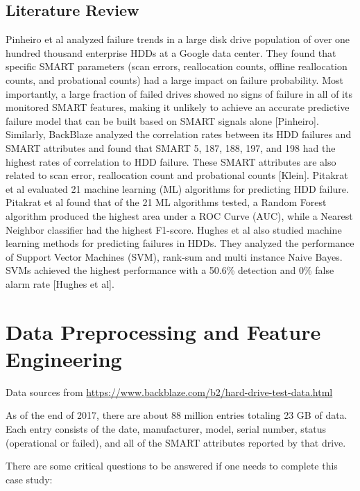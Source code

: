 \documentclass[12pt,a4paper,english]{amsart}
\begin{document}
\subsection{Literature Review}

Pinheiro et al analyzed failure trends in a large disk drive population of over one hundred thousand enterprise HDDs at a Google data center. They found that specific SMART parameters (scan errors, reallocation counts, offline reallocation counts, and probational counts) had a large impact on failure probability. Most importantly, a large fraction of failed drives showed no signs of failure in all of its monitored SMART features, making it unlikely to achieve an accurate predictive failure model that can be built based on SMART signals alone [Pinheiro]. Similarly, BackBlaze analyzed the correlation rates between its HDD failures and SMART attributes and found that SMART 5, 187, 188, 197, and 198 had the highest rates of correlation to HDD failure. These SMART attributes are also related   to   scan   error,   reallocation   count   and   probational   counts   [Klein].
Pitakrat et al evaluated 21 machine learning (ML) algorithms for predicting HDD failure. Pitakrat et al found that of the 21 ML algorithms tested, a Random Forest algorithm produced the highest area under a ROC Curve (AUC), while   a   Nearest   Neighbor   classifier   had   the   highest   F1-score.
Hughes et al also studied machine learning methods for predicting failures in HDDs. They analyzed the performance of Support Vector Machines (SVM), rank-sum and multi instance Naive Bayes. SVMs achieved the highest   performance   with   a   50.6\%   detection   and   0\%   false   alarm   rate   [Hughes   et   al].

%
\section{Data Preprocessing and Feature Engineering}

Data sources from \url{https://www.backblaze.com/b2/hard-drive-test-data.html}

As of the end of 2017, there are about 88 million entries totaling 23 GB of data. Each entry consists of the date, manufacturer, model, serial number, status (operational or failed), and all of the SMART attributes reported by that drive. 

There are some critical questions to be answered if one needs to complete this case study:
\end{document}
